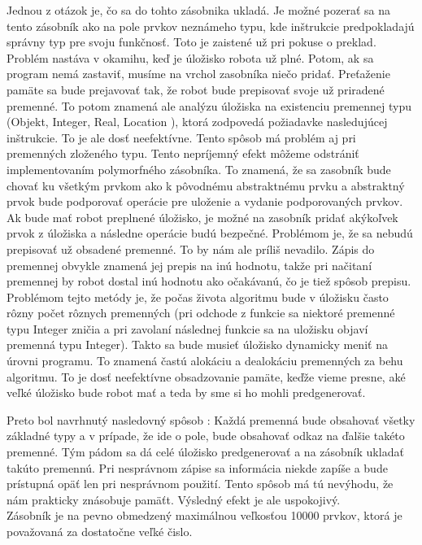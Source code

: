 Jednou z otázok je, čo sa do tohto zásobnika ukladá. Je možné pozerať sa na tento zásobník ako na pole prvkov neznámeho typu, kde inštrukcie predpokladajú správny typ pre svoju funkčnosť. Toto je zaistené už pri pokuse o preklad. Problém nastáva v okamihu, keď je úložisko robota už plné. Potom, ak sa program nemá zastaviť, musíme na vrchol zasobníka niečo pridať. Preťaženie pamäte sa bude prejavovať tak, že robot bude prepisovať svoje už priradené premenné. To potom znamená ale analýzu úložiska na existenciu premennej typu (Objekt, Integer, Real, Location ), ktorá zodpovedá požiadavke nasledujúcej inštrukcie. To je ale dosť neefektívne. Tento spôsob má problém aj pri premenných zloženého typu. %
Tento nepríjemný efekt môžeme odstrániť implementovaním polymorfného zásobníka. To znamená, že sa zasobník bude chovať ku všetkým prvkom ako k pôvodnému abstraktnému prvku a abstraktný prvok bude podporovať operácie pre uloženie a vydanie podporovaných prvkov. Ak bude mať robot preplnené úložisko, je možné na zasobník pridať akýkoľvek prvok z úložiska a následne operácie budú bezpečné. Problémom je, že sa nebudú prepisovať už obsadené premenné. To by nám ale príliš nevadilo. Zápis do premennej obvykle znamená jej prepis na inú hodnotu, takže pri načitaní premennej by robot dostal inú hodnotu ako očakávanú, čo je tiež spôsob prepisu. Problémom tejto metódy je, že počas života algoritmu bude v úložisku často rôzny počet rôznych premenných (pri odchode z funkcie sa niektoré premenné typu Integer zničia a pri zavolaní následnej funkcie sa na uložisku objaví premenná typu Integer). Takto sa bude musieť úložisko dynamicky meniť na úrovni programu. To znamená častú alokáciu a dealokáciu premenných za behu algoritmu. To je dosť neefektívne obsadzovanie pamäte, keďže vieme presne, aké veľké úložisko bude robot mať a teda by sme si ho mohli predgenerovať.
 
Preto bol navrhnutý nasledovný spôsob : Každá premenná bude obsahovať všetky základné typy a v prípade, že ide o pole, bude obsahovať odkaz na ďalšie takéto premenné. Tým pádom sa dá celé úložisko predgenerovať a na zásobník ukladať takúto premennú. Pri nesprávnom zápise sa informácia niekde zapíše a bude prístupná opäť len pri nesprávnom použití. Tento spôsob má tú nevýhodu, že nám prakticky znásobuje pamäťt. Výsledný efekt je ale uspokojivý. \\

Zásobník je na pevno obmedzený maximálnou veľkosťou 10000 prvkov, ktorá je považovaná za dostatočne veľké čislo. \\

